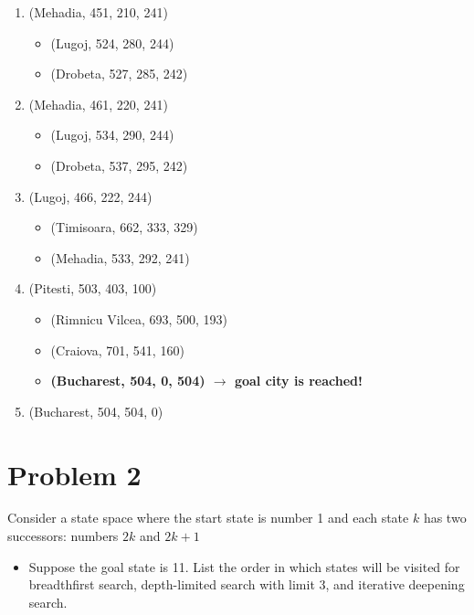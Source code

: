 \documentclass{article}
\begin{document}
\begin{enumerate}
\begin{itemize}
      \item (Lugoj, 466, 222, 244)
   \end{itemize}
   \item (Mehadia, 451, 210, 241)
   \begin{itemize}
      \item (Lugoj, 524, 280, 244)
      \item (Drobeta, 527, 285, 242)
   \end{itemize}
   \item (Mehadia, 461, 220, 241)
   \begin{itemize}
      \item (Lugoj, 534, 290, 244)
      \item (Drobeta, 537, 295, 242)
   \end{itemize}
   \item (Lugoj, 466, 222, 244)
   \begin{itemize}
      \item (Timisoara, 662, 333, 329)
      \item (Mehadia, 533, 292, 241)
   \end{itemize}
   \item (Pitesti, 503, 403, 100) 
   \begin{itemize}
      \item (Rimnicu Vilcea, 693, 500, 193)
      \item (Craiova, 701, 541, 160)
      \item \textbf{(Bucharest, 504, 0, 504) $\rightarrow$ goal city is reached!}
   \end{itemize}
   \item (Bucharest, 504, 504, 0)
\end{enumerate}




\section*{Problem 2}
Consider a state space where the start state is number 1 and each state $k$ has two successors:
numbers $2k$ and $2k + 1$
\begin{itemize}
   \item Suppose the goal state is 11. List the order in which states will be visited for breadthfirst search, depth-limited search with limit 3, and iterative deepening search.
\end{itemize}
\end{document}
